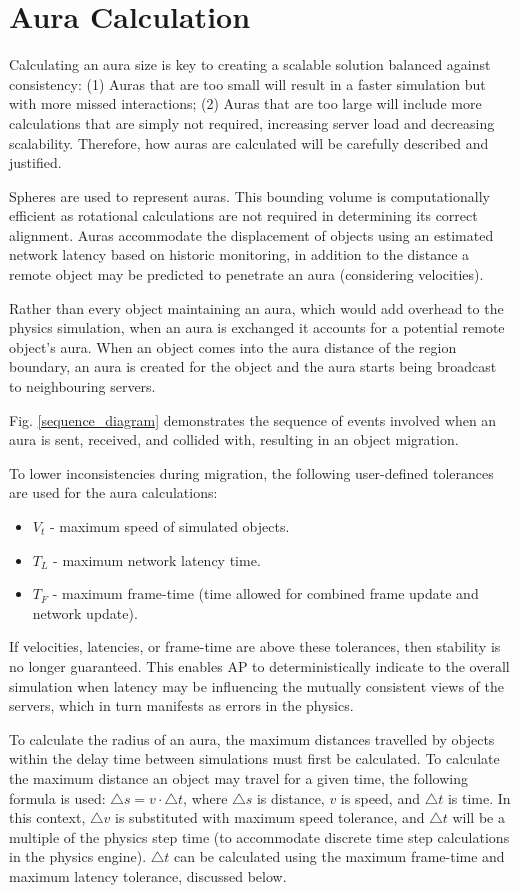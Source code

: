 \section{Aura Calculation}
Calculating an aura size is key to creating a scalable solution balanced against consistency: (1) Auras that are too small will result in a faster simulation but with more missed interactions; (2) Auras that are too large will include more calculations that are simply not required, increasing server load and decreasing scalability. Therefore, how auras are calculated will be carefully described and justified. 

Spheres are used to represent auras. This bounding volume is computationally efficient as rotational calculations are not required in determining its correct alignment. Auras accommodate the displacement of objects using an estimated network latency based on historic monitoring, in addition to the distance a remote object may be predicted to penetrate an aura (considering velocities).

Rather than every object maintaining an aura, which would add overhead to the physics simulation, when an aura is exchanged it accounts for a potential remote object's aura. When an object comes into the aura distance of the region boundary, an aura is created for the object and the aura starts being broadcast to neighbouring servers.

Fig. \ref{sequence_diagram} demonstrates the sequence of events involved when an aura is sent, received, and collided with, resulting in an object migration.

To lower inconsistencies during migration, the following user-defined tolerances are used for the aura calculations: 
\begin{itemize}
	\item $V_{t}$ - maximum speed of simulated objects.
	\item $T_{L}$ - maximum network latency time.
	\item $T_{F}$ - maximum frame-time (time allowed for combined frame update and network update).
\end{itemize}
If velocities, latencies, or frame-time are above these tolerances, then stability is no longer guaranteed. This enables AP to deterministically indicate to the overall simulation when latency may be influencing the mutually consistent views of the servers, which in turn manifests as errors in the physics.

To calculate the radius of an aura, the maximum distances travelled by objects within the delay time between simulations must first be calculated. To calculate the maximum distance an object may travel for a given time, the following formula is used: $\triangle s=v\cdot \triangle t$, where $ \triangle s$ is distance, $v$ is speed, and $ \triangle t$ is time. In this context, $ \triangle v$ is substituted with maximum speed tolerance, and $ \triangle t$ will be a multiple of the physics step time (to accommodate discrete time step calculations in the physics engine). $ \triangle t$ can be calculated using the maximum frame-time and maximum latency tolerance, discussed below.

